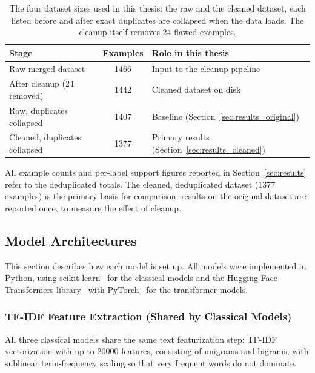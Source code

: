 \begin{table}[H]
\centering
\caption{The four dataset sizes used in this thesis: the raw and the cleaned dataset, each listed before and after exact duplicates are collapsed when the data loads. The cleanup itself removes 24 flawed examples.}
\label{tab:dataset_sizes}
\small
\setlength{\tabcolsep}{4pt}
\begin{tabular}{@{}lcl@{}}
\toprule
\textbf{Stage} & \textbf{Examples} & \textbf{Role in this thesis} \\
\midrule
Raw merged dataset            & 1466 & Input to the cleanup pipeline \\
After cleanup (24 removed)    & 1442 & Cleaned dataset on disk \\
Raw, duplicates collapsed     & 1407 & Baseline (Section~\ref{sec:results_original}) \\
Cleaned, duplicates collapsed & 1377 & Primary results (Section~\ref{sec:results_cleaned}) \\
\bottomrule
\end{tabular}
\end{table}

All example counts and per-label support figures reported in Section~\ref{sec:results} refer to the deduplicated totals. The cleaned, deduplicated dataset (1377 examples) is the primary basis for comparison; results on the original dataset are reported once, to measure the effect of cleanup.

\subsection{Model Architectures}
\label{sec:model_architectures}

This section describes how each model is set up. All models were implemented in Python, using scikit-learn~\cite{pedregosa2011scikit} for the classical models and the Hugging Face Transformers library~\cite{wolf2020transformers} with PyTorch~\cite{paszke2019pytorch} for the transformer models.

\subsubsection{TF-IDF Feature Extraction (Shared by Classical Models)}
\label{sec:tfidf_features}

All three classical models share the same text featurization step: TF-IDF vectorization with up to 20000 features, consisting of unigrams and bigrams, with sublinear term-frequency scaling so that very frequent words do not dominate.

